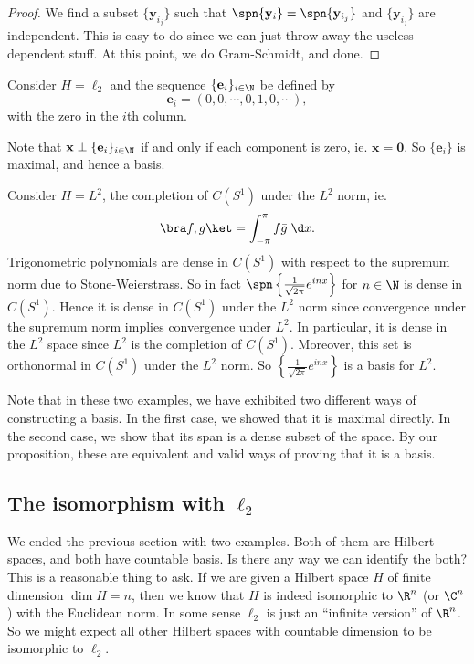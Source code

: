 \documentclass[a4paper]{article}
\begin{document}
\begin{proof}
  We find a subset $\{\mathbf{y}_{i_j}\}$ such that $\spn \{\mathbf{y}_i\} = \spn\{\mathbf{y}_{i_j}\}$ and $\{\mathbf{y}_{i_j}\}$ are independent. This is easy to do since we can just throw away the useless dependent stuff. At this point, we do Gram-Schmidt, and done.
\end{proof}

\begin{eg}
  Consider $H = \ell_2$ and the sequence $\{\mathbf{e}_i\}_{i \in \N}$ be defined by
  \[
    \mathbf{e}_i = (0, 0, \cdots, 0, 1, 0, \cdots),
  \]
  with the zero in the $i$th column.

  Note that $\mathbf{x} \perp \{\mathbf{e}_i\}_{i \in \N}$ if and only if each component is zero, ie. $\mathbf{x} = \mathbf{0}$. So $\{\mathbf{e}_i\}$ is maximal, and hence a basis.
\end{eg}

\begin{eg}
  Consider $H = L^2$, the completion of $C(S^1)$ under the $L^2$ norm, ie.
  \[
    \bra f, g\ket = \int_{-\pi}^\pi f\bar{g}\;\d x.
  \]
  Trigonometric polynomials are dense in $C(S^1)$ with respect to the supremum norm due to Stone-Weierstrass. So in fact $\spn \left\{\frac{1}{\sqrt{2\pi}}e^{inx}\right\}$ for $n \in \N$ is dense in $C(S^1)$. Hence it is dense in $C(S^1)$ under the $L^2$ norm since convergence under the supremum norm implies convergence under $L^2$. In particular, it is dense in the $L^2$ space since $L^2$ is the completion of $C(S^1)$. Moreover, this set is orthonormal in $C(S^1)$ under the $L^2$ norm. So $\left\{\frac{1}{\sqrt{2\pi}} e^{inx}\right\}$ is a basis for $L^2$.
\end{eg}
Note that in these two examples, we have exhibited two different ways of constructing a basis. In the first case, we showed that it is maximal directly. In the second case, we show that its span is a dense subset of the space. By our proposition, these are equivalent and valid ways of proving that it is a basis.

\subsection{The isomorphism with \texorpdfstring{$\ell_2$}{l2}}
We ended the previous section with two examples. Both of them are Hilbert spaces, and both have countable basis. Is there any way we can identify the both? This is a reasonable thing to ask. If we are given a Hilbert space $H$ of finite dimension $\dim H = n$, then we know that $H$ is indeed isomorphic to $\R^n$ (or $\C^n$) with the Euclidean norm. In some sense $\ell_2$ is just an ``infinite version'' of $\R^n$. So we might expect all other Hilbert spaces with countable dimension to be isomorphic to $\ell_2$.
\end{document}

